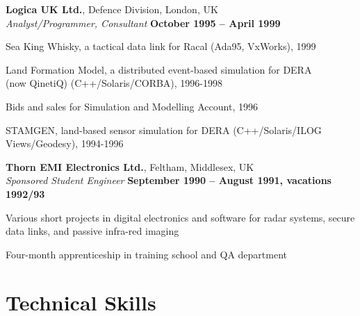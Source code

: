\documentclass[line]{resume}
\begin{document}
\begin{resume}
    \textbf{Logica UK Ltd.}, Defence Division, London, UK \vspace{2mm}\\\vspace{1mm}%
    \textsl{Analyst/Programmer, Consultant} \hfill \textbf{October 1995 -- April 1999}\vspace{-3mm}\\\vspace{-1mm}%
    \begin{list2}
        \item Sea King Whisky, a tactical data link for Racal (Ada95, VxWorks), 1999
        \item Land Formation Model, a distributed event-based simulation for DERA\\(now QinetiQ) (C++/Solaris/CORBA), 1996-1998
        \item Bids and sales for Simulation and Modelling Account, 1996
        \item STAMGEN, land-based sensor simulation for DERA (C++/Solaris/ILOG Views/Geodesy), 1994-1996
    \end{list2}\vspace{-1.5mm}

    \textbf{Thorn EMI Electronics Ltd.}, Feltham, Middlesex, UK \vspace{2mm}\\\vspace{1mm}%
    \textsl{Sponsored Student Engineer} \hfill \textbf{September 1990 -- August 1991, vacations 1992/93}\vspace{-3mm}\\\vspace{-1mm}%
    \begin{list2}
        \item Various short projects in digital electronics and software for radar systems, 
                  secure data links, and passive infra-red imaging
        \item Four-month apprenticeship in training school and QA department
    \end{list2}\vspace{-1.5mm}


    \section{\mysidestyle Technical Skills} 


\end{resume}
\end{document}
